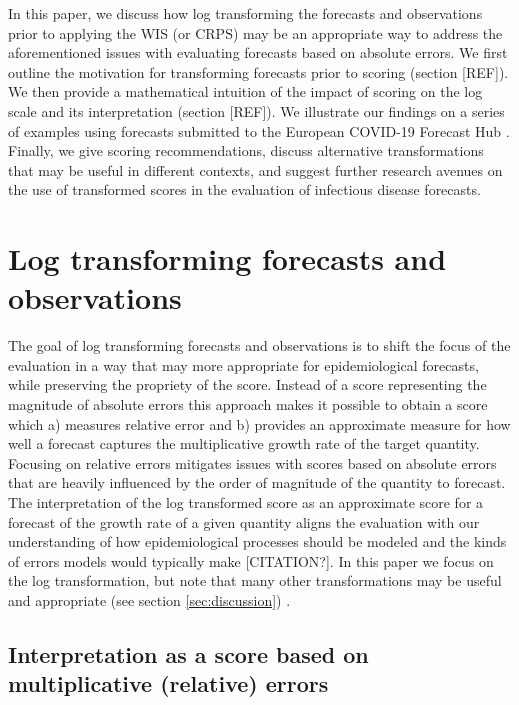 \documentclass{article}
\begin{document}
In this paper, we discuss how log transforming the forecasts and observations prior to applying the WIS (or CRPS) may be an appropriate way to address the aforementioned issues with evaluating forecasts based on absolute errors. We first outline the motivation for transforming forecasts prior to scoring (section [REF]). We then provide a mathematical intuition of the impact of scoring on the log scale and its interpretation (section [REF]). We illustrate our findings on a series of examples using forecasts submitted to the European COVID-19 Forecast Hub  \citep{europeancovid-19forecasthubEuropeanCovid19Forecast2021, sherrattPredictivePerformanceMultimodel2022}. Finally, we give scoring recommendations, discuss alternative transformations that may be useful in different contexts, and suggest further research avenues on the use of transformed scores in the evaluation of infectious disease forecasts. 


\section{Log transforming forecasts and observations}

The goal of log transforming forecasts and observations is to shift the focus of the evaluation in a way that may more appropriate for epidemiological forecasts, while preserving the propriety of the score. Instead of a score representing the magnitude of absolute errors this approach makes it possible to obtain a score which a) measures relative error and b) provides an approximate measure for how well a forecast captures the multiplicative growth rate of the target quantity. Focusing on relative errors mitigates issues with scores based on absolute errors that are heavily influenced by the order of magnitude of the quantity to forecast. The interpretation of the log transformed score as an approximate score for a forecast of the growth rate of a given quantity aligns the evaluation with our understanding of how epidemiological processes should be modeled and the kinds of errors models would typically make [CITATION?]. In this paper we focus on the log transformation, but note that many other transformations may be useful and appropriate (see section \ref{sec:discussion}) .


\subsection{Interpretation as a score based on multiplicative (relative) errors}
\end{document}
